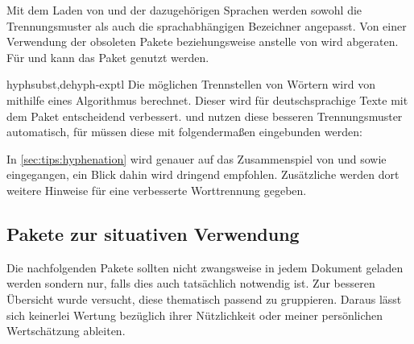 \begin{packages}
  Mit dem Laden von  und der dazugehörigen Sprachen werden 
  sowohl die Trennungsmuster als auch die sprachabhängigen Bezeichner angepasst.
  Von einer Verwendung der obsoleten Pakete  beziehungsweise 
   anstelle von  wird abgeraten. Für 
   und  kann das Paket  
  genutzt werden.
\item[hyphsubst,dehyph-exptl]
  Die möglichen Trennstellen von Wörtern wird von  mithilfe 
  eines Algorithmus berechnet. Dieser wird für deutschsprachige Texte mit dem 
  Paket  entscheidend verbessert.  und 
   nutzen diese besseren Trennungsmuster automatisch, für 
   müssen diese mit folgendermaßen eingebunden werden:
  \begin{Code}
    \usepackage[ngerman=ngerman-x-latest]{hyphsubst}
  \end{Code}\vspace{-\baselineskip}%
  In \autoref{sec:tips:hyphenation} wird genauer auf das Zusammenspiel von 
   und  sowie  eingegangen, 
  ein Blick dahin wird dringend empfohlen. Zusätzliche werden dort weitere 
  Hinweise für eine verbesserte Worttrennung gegeben.
\end{packages}



\subsection{Pakete zur situativen Verwendung}
Die nachfolgenden Pakete sollten nicht zwangsweise in jedem Dokument geladen 
werden sondern nur, falls dies auch tatsächlich notwendig ist. Zur besseren 
Übersicht wurde versucht, diese thematisch passend zu gruppieren. Daraus lässt 
sich keinerlei Wertung bezüglich ihrer Nützlichkeit oder meiner persönlichen 
Wertschätzung ableiten.



